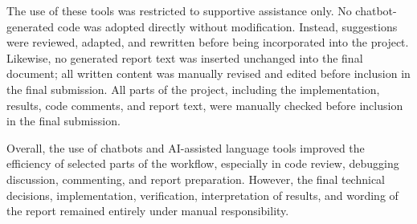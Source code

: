 The use of these tools was restricted to supportive assistance only. No chatbot-generated code was adopted directly without modification. Instead, suggestions were reviewed, adapted, and rewritten before being incorporated into the project. Likewise, no generated report text was inserted unchanged into the final document; all written content was manually revised and edited before inclusion in the final submission. All parts of the project, including the implementation, results, code comments, and report text, were manually checked before inclusion in the final submission.

Overall, the use of chatbots and AI-assisted language tools improved the efficiency of selected parts of the workflow, especially in code review, debugging discussion, commenting, and report preparation. However, the final technical decisions, implementation, verification, interpretation of results, and wording of the report remained entirely under manual responsibility.